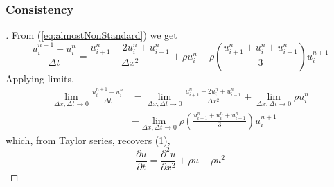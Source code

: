 \documentclass[a4paper]{article}
\begin{document}
		\subsubsection{Consistency}
		\begin{proof}[]
    		From (\ref{eq:almostNonStandard}) we get
    		\begin{equation*}
    		   \frac{u_i^{n+1} -u_i^{n} }{\Delta t} = \frac{u_{i+1}^n - 2u_i^n + u_{i-1}^n }{\Delta x^2}+\rho u_i^n-\rho (\frac{u_{i+1}^n + u_i^n + u_{i-1}^n}{3})u_i^{n+1}
    		\end{equation*}
    		Applying limits,
            \begin{equation*}
            \begin{split}
                 \lim_{\Delta x, \Delta t\rightarrow 0}\frac{u_i^{n+1} -u_i^{n} }{\Delta t} & = \lim_{\Delta x, \Delta t\rightarrow 0}\frac{u_{i+1}^n - 2u_i^n + u_{i-1}^n }{\Delta x^2} + \lim_{\Delta x, \Delta t\rightarrow 0}\rho u_i^n \\
                 & - \lim_{\Delta x, \Delta t\rightarrow 0}\rho (\frac{u_{i+1}^n + u_i^n + u_{i-1}^n}{3})u_i^{n+1}
            \end{split}
    		\end{equation*}
    		which, from Taylor series, recovers (1),
    		\begin{equation*}
    		    \frac{\partial u}{\partial t} = \frac{\partial^2 u}{\partial x^2} + \rho u - \rho u^2
    		\end{equation*}
		\end{proof}
\end{document}
